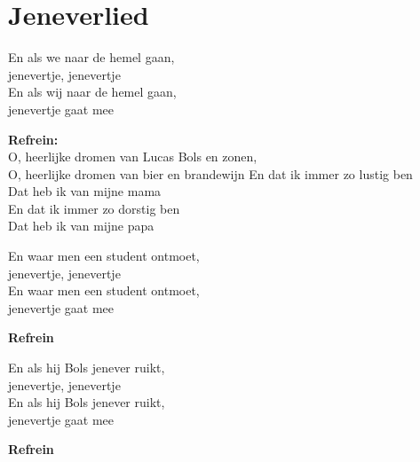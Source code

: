 \section{Jeneverlied}
En als we naar de hemel gaan,\\
jenevertje, jenevertje\\
En als wij naar de hemel gaan,\\
jenevertje gaat mee

\textbf{Refrein:}\\
O, heerlijke dromen van Lucas Bols en zonen,\\
O, heerlijke dromen van bier en brandewijn
En dat ik immer zo lustig ben\\
Dat heb ik van mijne mama\\
En dat ik immer zo dorstig ben \\
Dat heb ik van mijne papa

En waar men een student ontmoet,\\
jenevertje, jenevertje\\
En waar men een student ontmoet,\\
jenevertje gaat mee

\textbf{Refrein}

En als hij Bols jenever ruikt,\\
jenevertje, jenevertje\\
En als hij Bols jenever ruikt,\\
jenevertje gaat mee

\textbf{Refrein}

